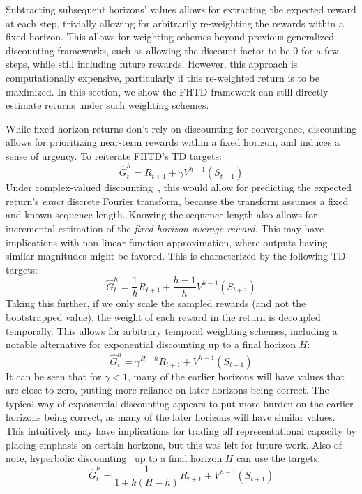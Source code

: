 \begin{appendices}
Subtracting subsequent horizons' values allows for extracting the expected reward at each step, trivially allowing for arbitrarily re-weighting the rewards within a fixed horizon. This allows for weighting schemes beyond previous generalized discounting frameworks, such as allowing the discount factor to be 0 for a few steps, while still including future rewards. However, this approach is computationally expensive, particularly if this re-weighted return is to be maximized. In this section, we show the FHTD framework can still directly estimate returns under such weighting schemes.

While fixed-horizon returns don't rely on discounting for convergence, discounting allows for prioritizing near-term rewards within a fixed horizon, and induces a sense of urgency. To reiterate FHTD's TD targets:
\begin{equation*}
\hat{G}^h_t = R_{t+1} + \gamma V^{h-1}(S_{t+1})
\end{equation*}
Under complex-valued discounting~\cite{tddft2019}, this would allow for predicting the expected return's \textit{exact} discrete Fourier transform, because the transform assumes a fixed and known sequence length.
Knowing the sequence length also allows for incremental estimation of the \textit{fixed-horizon average reward}. This may have implications with non-linear function approximation, where outputs having similar magnitudes might be favored. This is characterized by the following TD targets:
\begin{equation}
\hat{G}^h_t = \frac{1}{h}R_{t+1} + \frac{h-1}{h} V^{h-1}(S_{t+1})
\label{eqn:avgfhtdtarget}
\end{equation}
Taking this further, if we only scale the sampled rewards (and not the bootstrapped value), the weight of each reward in the return is decoupled temporally. This allows for arbitrary temporal weighting schemes, including a notable alternative for exponential discounting up to a final horizon $H$:
\begin{equation}
\hat{G}^h_t = \gamma^{H - h}R_{t+1} + V^{h-1}(S_{t+1})
\label{eqn:rexpfhtdtarget}
\end{equation}
It can be seen that for $\gamma < 1$, many of the earlier horizons will have values that are close to zero, putting more reliance on later horizons being correct. The typical way of exponential discounting appears to put more burden on the earlier horizons being correct, as many of the later horizons will have similar values. This intuitively may have implications for trading off representational capacity by placing emphasis on certain horizons, but this was left for future work. Also of note, hyperbolic discounting~\cite{hyperbolic2019} up to a final horizon $H$ can use the targets:
\begin{equation}
\hat{G}^h_t = \frac{1}{1 + k(H - h)}R_{t+1} + V^{h-1}(S_{t+1})
\label{eqn:hyperfhtdtarget}
\end{equation}


\end{appendices}
